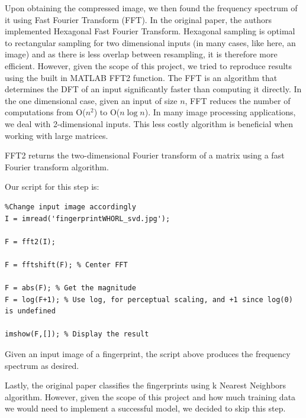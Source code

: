 \documentclass[letter]{amsart}
\begin{document}
Upon obtaining the compressed image, we then found the frequency spectrum of it using Fast Fourier Transform (FFT). In the original paper, the authors implemented Hexagonal Fast Fourier Transform. Hexagonal sampling is optimal to rectangular sampling for two dimensional inputs (in many cases, like here, an image) and as there is less overlap between resampling, it is therefore more efficient. However, given the scope of this project, we tried to reproduce results using the built in MATLAB FFT2 function.
The FFT is an algorithm that determines the DFT of an input significantly faster than computing it directly. In the one dimensional case, given an input of size $n$, FFT reduces the number of computations from O($n^2$) to O($n\log n$). In many image processing applications, we deal with 2-dimensional inputs. This less costly algorithm is beneficial when working with large matrices. 

FFT2 returns the two-dimensional Fourier transform of a matrix using a fast Fourier transform algorithm.

Our script for this step is:
\begin{verbatim}
%Change input image accordingly
I = imread('fingerprintWHORL_svd.jpg');

F = fft2(I);

F = fftshift(F); % Center FFT

F = abs(F); % Get the magnitude
F = log(F+1); % Use log, for perceptual scaling, and +1 since log(0) is undefined

imshow(F,[]); % Display the result
\end{verbatim}

Given an input image of a fingerprint, the script above produces the frequency spectrum as desired.

Lastly, the original paper classifies the fingerprints using k Nearest Neighbors algorithm. However, given the scope of this project and how much training data we would need to implement a successful model, we decided to skip this step. 
\end{document}
